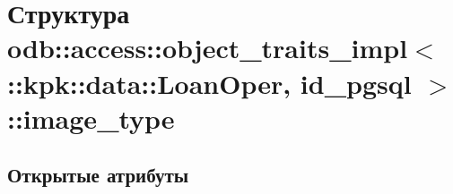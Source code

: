 \hypertarget{structodb_1_1access_1_1object__traits__impl_3_01_1_1kpk_1_1data_1_1_loan_oper_00_01id__pgsql_01_4_1_1image__type}{}\section{Структура odb\+:\+:access\+:\+:object\+\_\+traits\+\_\+impl$<$ \+:\+:kpk\+:\+:data\+:\+:Loan\+Oper, id\+\_\+pgsql $>$\+:\+:image\+\_\+type}
\label{structodb_1_1access_1_1object__traits__impl_3_01_1_1kpk_1_1data_1_1_loan_oper_00_01id__pgsql_01_4_1_1image__type}
\subsection*{Открытые атрибуты}
